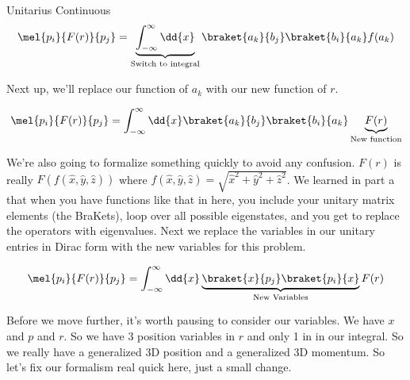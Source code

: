 \begin{answer}
\begin{answerpart}{Unitarius Continuous}
    \begin{equation}
      \begin{alignedat}{2}
        &&\mel{p_i}{F(r)}{p_j}
        &= \underbrace{\int_{-\infty}^{\infty} \dd{x}}_{\text{Switch to integral}}
        \braket{a_k}{b_j}\braket{b_i}{a_k}f(a_k)
        \\
      \end{alignedat}
    \end{equation}

    Next up, we'll replace our function of $a_k$ with our new function
    of $r$.
    
    \begin{equation}
      \begin{alignedat}{2}
        &&\mel{p_i}{F(r)}{p_j}
        &= \int_{-\infty}^{\infty} \dd{x}
        \braket{a_k}{b_j}\braket{b_i}{a_k}\underbrace{F(r)}_{\text{New function}}
        \\
      \end{alignedat}
    \end{equation}

    We're also going to formalize something quickly to avoid any
    confusion.  $F(r)$ is really $F(f(\hat{x}, \hat{y}, \hat{z}))$
    where $f(\hat{x}, \hat{y}, \hat{z}) = \sqrt{\hat{x}^2 + \hat{y}^2
      + \hat{z}^2}$.  We learned in part a that when you have
    functions like that in here, you include your unitary matrix
    elements (the BraKets), loop over all possible eigenstates, and
    you get to replace the operators with eigenvalues.  Next we
    replace the variables in our unitary entries in Dirac form with
    the new variables for this problem.

    \begin{equation}
      \begin{alignedat}{2}
        &&\mel{p_i}{F(r)}{p_j}
        &= \int_{-\infty}^{\infty} \dd{x}
        \underbrace{\braket{x}{p_j}\braket{p_i}{x}}_{\text{New Variables}}F(r)
        \\
      \end{alignedat}
    \end{equation}

    Before we move further, it's worth pausing to consider our
    variables.  We have $x$ and $p$ and $r$.  So we have 3 position
    variables in $r$ and only 1 in in our integral.  So we really have
    a generalized 3D position and a generalized 3D momentum.  So let's
    fix our formalism real quick here, just a small change.


\end{answerpart}
\end{answer}
